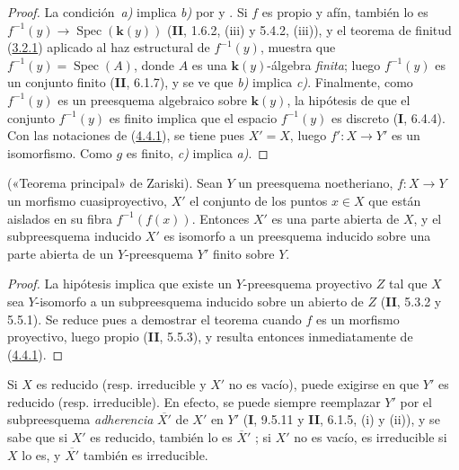 \begin{proof}
La condición~\emph{a)} implica \emph{b)} por  y
. Si $f$ es propio y afín, también lo es
$f^{-1}(y)\to\operatorname{Spec}(\boldsymbol{k}(y))$ (\textbf{II}, 1.6.2, (iii) y 5.4.2, (iii)), y el teorema de finitud (\hyperref[III.3.2.1-fr]{3.2.1}) aplicado al haz estructural de $f^{-1}(y)$, muestra
que $f^{-1}(y)=\operatorname{Spec}(A)$, donde
$A$ es una $\boldsymbol{k}(y)$-álgebra \emph{finita}; luego $f^{-1}(y)$ es un conjunto finito (\textbf{II}, 6.1.7), y se ve que \emph{b)} implica \emph{c)}. Finalmente, como $f^{-1}(y)$ es un preesquema
algebraico sobre $\boldsymbol{k}(y)$, la hipótesis de que el conjunto $f^{-1}(y)$ es
finito implica que el espacio $f^{-1}(y)$ es discreto (\textbf{I}, 6.4.4). Con las
notaciones de (\hyperref[III.4.4.1-fr]{4.4.1}), se tiene pues $X'=X$, luego
$f':X\to Y'$ es un isomorfismo. Como $g$ es finito, \emph{c)} implica \emph{a)}.
\end{proof}

\begin{theorem}[4.4.3]
\label{III.4.4.3-fr}
\textnormal{(«Teorema principal» de Zariski).}
Sean $Y$ un preesquema noetheriano, $f:X\to Y$ un morfismo cuasiproyectivo,
$X'$ el conjunto de los puntos $x\in X$ que están aislados en su fibra
$f^{-1}(f(x))$. Entonces $X'$ es una parte abierta de $X$, y el
subpreesquema inducido $X'$ es isomorfo a un preesquema inducido sobre una parte
abierta de un $Y$-preesquema $Y'$ finito sobre $Y$.
\end{theorem}

\begin{proof}
La hipótesis implica que existe un $Y$-preesquema proyectivo $Z$ tal que $X$
sea $Y$-isomorfo a un subpreesquema inducido sobre un abierto de $Z$
(\textbf{II}, 5.3.2 y 5.5.1). Se reduce pues a demostrar el teorema cuando $f$
es un morfismo proyectivo, luego propio (\textbf{II}, 5.5.3), y resulta entonces
inmediatamente de (\hyperref[III.4.4.1-fr]{4.4.1}).
\end{proof}

\begin{remark}[4.4.4]
\label{III.4.4.4-fr}
Si $X$ es reducido (resp. irreducible y $X'$ no
es vacío), puede exigirse en  que $Y'$ es reducido (resp. irreducible). En efecto, se puede siempre reemplazar $Y'$ por el subpreesquema \emph{adherencia} $\overline{X'}$ de $X'$ en $Y'$ (\textbf{I}, 9.5.11 y \textbf{II}, 6.1.5, (i) y (ii)), y se sabe que si $X'$ es reducido, también
lo es $\overline{X}'$ ; si $X'$ no es vacío, es
irreducible si $X$ lo es, y $\overline{X'}$ también es irreducible.
\end{remark}

